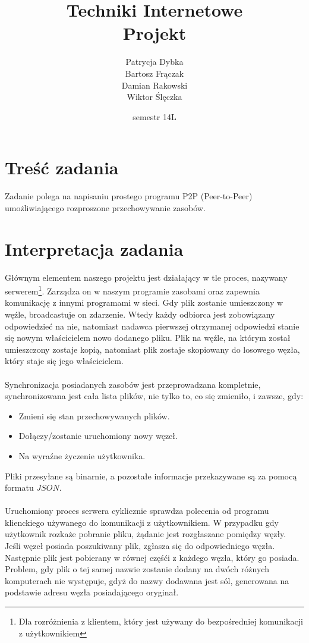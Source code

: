 \documentclass[10pt,a4paper]{article}
\title{Techniki Internetowe\\
       \textbf{Projekt}}
\date{semestr 14L}
\author{Patrycja Dybka\\
		Bartosz Frączak\\
		Damian Rakowski\\
		Wiktor Ślęczka}
\begin{document}
\maketitle
\newpage

\tableofcontents
\newpage

\section{Treść zadania}
Zadanie polega na napisaniu prostego programu P2P (Peer-to-Peer) umożliwiającego rozproszone przechowywanie zasobów.
\section{Interpretacja zadania}
Głównym elementem naszego projektu jest działający w tle proces,
nazywany serwerem\footnote{Dla rozróżnienia z klientem, który jest
używany do bezpośredniej komunikacji z użytkownikiem}.
Zarządza on w naszym programie zasobami oraz zapewnia komunikację z innymi
programami w sieci. Gdy plik zostanie umieszczony w węźle, broadcastuje on
zdarzenie. Wtedy każdy odbiorca jest zobowiązany odpowiedzieć na nie,
natomiast nadawca pierwszej otrzymanej odpowiedzi stanie się
nowym właścicielem nowo dodanego pliku.
Plik na węźle, na którym został umieszczony zostaje kopią,
natomiast plik zostaje skopiowany do losowego węzła, który staje się
jego właścicielem.\\
\\
Synchronizacja posiadanych zasobów jest przeprowadzana kompletnie, synchronizowana jest cała lista plików, nie tylko to, co się zmieniło, i zawsze, gdy:
\begin{itemize}
\item Zmieni się stan przechowywanych plików.
\item Dołączy/zostanie uruchomiony nowy węzeł.
\item Na wyraźne życzenie użytkownika.
\end{itemize}

Pliki przesyłane są binarnie, a pozostałe informacje przekazywane są za pomocą formatu $JSON$.\\
\\Uruchomiony proces serwera cyklicznie sprawdza polecenia od programu klienckiego używanego do komunikacji z użytkownikiem. W przypadku gdy użytkownik rozkaże pobranie pliku, żądanie jest rozgłaszane pomiędzy węzły. Jeśli węzeł posiada poszukiwany plik, zgłasza się do odpowiedniego węzła. Następnie plik jest pobierany w równej częśći z każdego węzła, który go posiada. Problem, gdy plik o tej samej nazwie zostanie dodany na dwóch różnych komputerach nie występuje, gdyż do nazwy dodawana jest sól, generowana na podstawie adresu węzła posiadającego oryginał.\\
\end{document}
